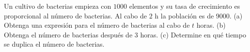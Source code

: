 \item Un cultivo de bacterias empieza con $1000$ elementos y su tasa de crecimiento es proporcional al número de bacterias. Al cabo de $2 \text{ h}$ la población es de $9000$. (a) Obtenga una expresión para el número de bacterias al cabo de $t$ horas. (b) Obtenga el número de bacterias después de $3$ horas. (c) Determine en qué tiempo se duplica el número de bacterias.
